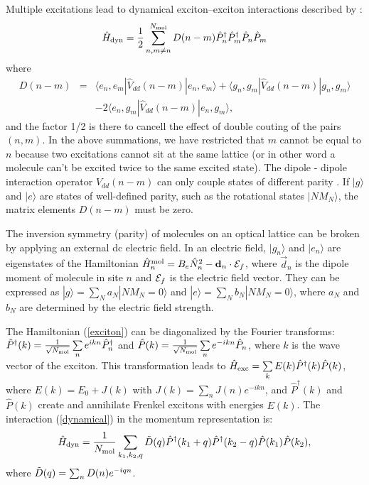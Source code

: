 Multiple excitations lead to dynamical exciton--exciton interactions described by \cite{agranovich}:
\begin{equation}\label{dynamical}
\hat{H}_{\rm dyn} = \frac{1}{2} \sum\limits_{n,m \neq n}^{N_{\rm mol}} D(n-m)
\hat{P}_{n}^\dag \hat{P}_{m}^\dag \hat{P}_{n} \hat{P}_{m} 
\end{equation}
where 
\begin{eqnarray}
D(n - m)& =& \langle e_{n}, e_{m} | \hat{V}_{dd}(n-m) | e_{n}, e_{m} \rangle +
\langle g_{n}, g_{m} | \hat{V}_{dd}(n-m) | g_{n}, g_{m} \rangle  \nonumber \\
& & - 2\langle e_{n}, g_{m} |\hat{V}_{dd}(n-m) | e_{n}, g_{m} \rangle ,
\end{eqnarray} 
and the factor 1/2 is there to cancell the effect of double couting of the pairs $(n, m)$. In the above summations, we
 have restricted that $m$ cannot be equal to $n$ because two excitations cannot sit at the same lattice (or in other
 word a molecule can't be excited twice to the same excited state). The dipole - dipole interaction operator
 $\hat{V}_{dd}(n-m)$ can only couple states of different parity \cite{RotSpect}. If $|g \rangle$ and $| e \rangle$ are
 states of well-defined parity, such as the rotational states $|NM_N \rangle$, the matrix elements $D(n-m)$ must be
 zero. 

 The inversion symmetry (parity) of molecules on an optical lattice can be broken by applying an external dc electric
 field. In an electric field, $|g_{n} \rangle$ and $| e_{n} \rangle$ are eigenstates of the Hamiltonian 
$\hat{H}^{\rm mol}_n = B_e \hat{N}_n^2 - {\vec d}_n \cdot  {\vec {\cal E}_f}$, where ${\vec d}_n$ is the dipole moment
 of molecule in site $n$ and ${\vec {\cal E}_f}$ is the electric field vector. They can be expressed as 
$| g \rangle = \sum_N a_N |N M_N = 0 \rangle$ and $| e \rangle = \sum_N b_N |N M_N = 0 \rangle$, where 
 $a_N$ and $b_N$ are determined by the electric field strength.  
 
 The Hamiltonian (\ref{exciton}) can be diagonalized by the Fourier transforms: $\hat{P}^\dag(k) = \frac{1}{\sqrt{N_{\rm mol}}}
\sum\limits_n e^{ikn} \hat{P}_n^\dag$ and $\hat{P}(k) =
\frac{1}{\sqrt{N_{\rm mol}}} \sum\limits_n e^{-ikn} \hat{P}_n$,  where
$k$ is the wave vector of the exciton.  This transformation leads to 
 $\hat{H}_{\rm exc} = \sum\limits_k E(k)
\hat{P}^\dag(k) \hat{P}(k)$, where $E(k) = E_0 + J(k)$ with $J(k) =
\sum\limits_n J(n) e^{-ikn}$, and  $\hat{P}^\dag(k)$ and $\hat{P}(k)$ 
create and annihilate Frenkel excitons with energies $E(k)$.  The interaction (\ref{dynamical})
in the momentum representation is: 
\begin{equation}\label{dynamical-k}
\hat{H}_{\rm dyn} = \frac{1}{N_{\rm mol}} \sum\limits_{k_1, k_2, q} \Tilde{D}(q)
\hat{P}^\dag(k_1+q) \hat{P}^\dag(k_2-q) \hat{P}(k_1) \hat{P}(k_2),
\end{equation}
where $\Tilde{D}(q) = \sum_n D(n) e^{-iqn}$. 



